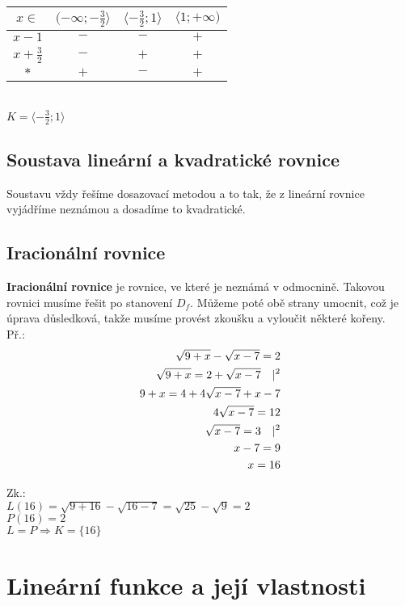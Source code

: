 \documentclass[12pt, a4paper]{article}
\newcommand{\imply}{\Rightarrow}
\begin{document}
\begin{center}
\begin{tabular}{| c | c | c | c |}
\hline
$x \in$ & $(-\infty;-\frac{3}{2} \rangle$ & $\langle -\frac{3}{2};1 \rangle$ & $\langle 1; +\infty)$\\
\hline
$x-1$ & $-$ & $-$ & $+$\\
\hline
$x+\frac{3}{2}$ & $-$ & $+$ & $+$\\
\hline
$*$ & $+$ & $-$ & $+$\\
\hline
\end{tabular}\\
$K = \langle -\frac{3}{2};1 \rangle$\\
\end{center}

\subsection*{Soustava lineární a kvadratické rovnice}
Soustavu vždy řešíme dosazovací metodou a to tak, že z lineární rovnice vyjádříme neznámou a dosadíme to kvadratické.

\subsection*{Iracionální rovnice}
\textbf{Iracionální rovnice} je rovnice, ve které je neznámá v odmocnině. Takovou rovnici musíme řešit po stanovení $D_f$. Můžeme poté obě strany umocnit, což je úprava důsledková,
takže musíme provést zkoušku a vyloučit některé kořeny.\\
Př.:\\
\[
\begin{aligned}
\sqrt{9+x}-\sqrt{x-7}=2\\
\sqrt{9+x}=2+\sqrt{x-7} \text{\quad} |^2\\
9+x = 4 + 4\sqrt{x-7} + x - 7\\
4\sqrt{x-7} = 12\\
\sqrt{x-7} = 3 \text{\quad} |^2\\
x-7 = 9\\
x=16
\end{aligned}
\]

Zk.:\\
$ L(16)=\sqrt{9+16} - \sqrt{16-7}=\sqrt{25}-\sqrt{9}=2$\\
$P(16)=2$\\
$L = P \imply K=\{ 16 \}$

\section{Lineární funkce a její vlastnosti}
\end{document}
